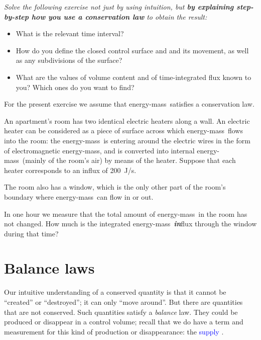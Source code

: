 \documentclass[a4paper,12pt,%
onecolumn,oneside,%
british%
]{memoir}
\renewcommand*{\|}[1][]{\nonscript\:#1\vert\nonscript\:\mathopen{}}
\newcommand*{\sect}{\S}%
\renewcommand*{\autoref}[3][\sect\,\ref]{\textcolor{blue}{#3}
\raisebox{0.6ex}{\color{blue}\miniscule%
\faIcon{angle-right}%
\;#1{#2}\;p.\,\pageref{#2}}}
\newcommand*{\energym}{energy-mass}
\begin{document}
\begin{exercise}
{\itshape Solve the following exercise not just by using intuition, but \textbf{by explaining step-by-step how you use a conservation law} to obtain the result:
\begin{itemize}[nosep]
\item What is the relevant time interval?
\item How do you define the closed control surface and and its movement, as well as any subdivisions of the surface?
\item What are the values of volume content and of time-integrated flux  known to you? Which ones do you want to find?
\end{itemize}}

\medskip

For the present exercise we assume that \energym\ satisfies a conservation law.

    \smallskip

An apartment's room has two identical electric heaters along a wall. An electric heater can be considered as a piece of surface across which \energym\ flows into the room: the \energym\ is entering around the electric wires in the form of electromagnetic \energym, and is converted into internal \energym\ (mainly of the room's air) by means of the heater. Suppose that each heater corresponds to an influx of \qty{200}{J/s}.

\smallskip

    The room also has a window, which is the only other part of the room's boundary where \energym\ can flow in or out.

    \smallskip

    In one hour we measure that the total amount of \energym\ in the room has not changed. How much is the integrated \energym\ \emph{\textbf{in}}flux through the window during that time?
\end{exercise}




\section{Balance laws}
\label{sec:balance_laws}

Our intuitive understanding of a conserved quantity is that it cannot be \enquote{created} or \enquote{destroyed}; it can only \enquote{move around}. But there are quantities that are not conserved. Such quantities satisfy a \emph{balance} law. They could be produced or disappear in a control volume; recall that we do have a term and measurement for this kind of production or disappearance: the \autoref{def:fluxsupply}{supply}.
\end{document}
